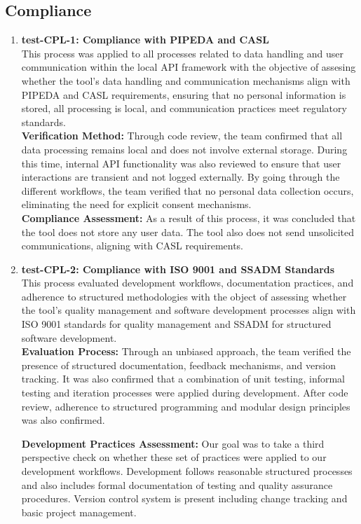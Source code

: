 \documentclass[12pt, titlepage]{article}
\begin{document}
\subsection{Compliance}
\begin{enumerate}

  \item \textbf{test-CPL-1: Compliance with PIPEDA and CASL} \\[2mm]
    This process was applied to all processes related to data
    handling and user communication within the local API framework
    with the objective of assesing whether the tool's data handling
    and communication mechanisms align with PIPEDA and CASL
    requirements, ensuring that no personal information is stored,
    all processing is local, and communication practices meet
    regulatory standards.\\
    
    \noindent \textbf{Verification Method:} Through code review, the team confirmed that all data
    processing remains local and does not involve external storage.
    During this time, internal API functionality was also reviewed to
    ensure that user interactions are transient and not logged
    externally. By going through the different workflows, the team
    verified that no personal data collection occurs, eliminating the
    need for explicit consent mechanisms.\\
    
    \noindent \textbf{Compliance Assessment:} As a result of this process, it was concluded that the
    tool does not store any user data. The tool also does not send
    unsolicited communications, aligning with CASL requirements.

  \item \textbf{test-CPL-2: Compliance with ISO 9001 and SSADM
    Standards} \\[2mm]
    This process evaluated development workflows, documentation
    practices, and adherence to structured methodologies with the
    object of assessing whether the tool's quality management and
    software development processes align with ISO 9001 standards for
    quality management and SSADM for structured software development.\\
    
    \noindent \textbf{Evaluation Process:} Through an unbiased approach, the team verified the
    presence of structured documentation, feedback mechanisms, and
    version tracking. It was also confirmed that a combination of
    unit testing, informal testing and iteration processes were
    applied during development. After code review, adherence to
    structured programming and modular design principles was also confirmed.
    
    \noindent \textbf{Development Practices Assessment:} Our goal was to take a third perspective check on
    whether these set of practices were applied to our development
    workflows. Development follows reasonable structured processes
    and also includes formal documentation of testing and quality
    assurance procedures. Version control system is present including
    change tracking and basic project management.

\end{enumerate}
\end{document}

